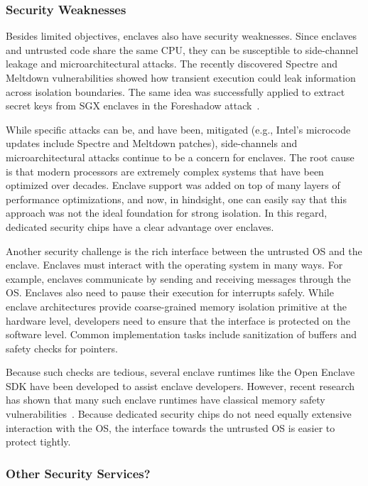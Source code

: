 \documentclass[letterpaper,twocolumn,10pt]{article}
\begin{document}
\subsubsection*{Security Weaknesses}

Besides limited objectives, enclaves also have security weaknesses. Since enclaves and untrusted code share the same CPU, they can be susceptible to side-channel leakage and microarchitectural attacks. The recently discovered Spectre and Meltdown vulnerabilities showed how transient execution could leak information across isolation boundaries. The same idea was successfully applied to extract secret keys from SGX enclaves in the Foreshadow attack~\cite{van2018foreshadow}. 

While specific attacks can be, and have been, mitigated (e.g., Intel's microcode updates include Spectre and Meltdown patches), side-channels and microarchitectural attacks continue to be a concern for enclaves. The root cause is that modern processors are extremely complex systems that have been optimized over decades. Enclave support was added on top of many layers of performance optimizations, and now, in hindsight, one can easily say that this approach was not the ideal foundation for strong isolation. In this regard, dedicated security chips have a clear advantage over enclaves.

Another security challenge is the rich interface between the untrusted OS and the enclave. Enclaves must interact with the operating system in many ways. For example, enclaves communicate by sending and receiving messages through the OS. Enclaves also need to pause their execution for interrupts safely. While enclave architectures provide coarse-grained memory isolation primitive at the hardware level, developers need to ensure that the interface is protected on the software level. Common implementation tasks include sanitization of buffers and safety checks for pointers. 

Because such checks are tedious, several enclave runtimes like the Open Enclave SDK have been developed to assist enclave developers. However, recent research has shown that many such enclave runtimes have classical memory safety vulnerabilities~\cite{van2019tale}. Because dedicated security chips do not need equally extensive interaction with the OS, the interface towards the untrusted OS is easier to protect tightly. 


\subsubsection*{Other Security Services?}
\end{document}
